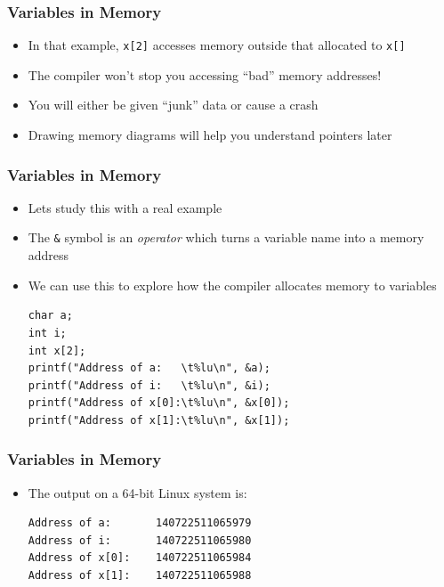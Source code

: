 \documentclass[14pt]{beamer}
\begin{document}
\begin{frame}
\frametitle{Variables in Memory}
\begin{itemize}
\item In that example, \texttt{x[2]} accesses memory outside that allocated to \texttt{x[]}
\item The compiler won't stop you accessing ``bad'' memory addresses!
\item You will either be given ``junk'' data or cause a crash
\item Drawing memory diagrams will help you understand pointers later
\end{itemize}
\end{frame}

\begin{frame}[fragile]
\frametitle{Variables in Memory}
\begin{itemize}
\item Lets study this with a real example
\item The \texttt{\&} symbol is an \textit{operator} which turns a variable name into a memory address
\item We can use this to explore how the compiler allocates memory to variables
\begin{lstlisting}[style=CStyle]
char a; 
int i; 
int x[2]; 
printf("Address of a:   \t%lu\n", &a); 
printf("Address of i:   \t%lu\n", &i); 
printf("Address of x[0]:\t%lu\n", &x[0]); 
printf("Address of x[1]:\t%lu\n", &x[1]); 
\end{lstlisting}
\end{itemize}
\end{frame}

\begin{frame}[fragile]
\frametitle{Variables in Memory}
\begin{itemize}
\item The output on a 64-bit Linux system is:
\begin{lstlisting}[style=pseudo]
Address of a:   	140722511065979
Address of i:   	140722511065980
Address of x[0]:	140722511065984
Address of x[1]:	140722511065988
\end{lstlisting}
\end{itemize}
\end{frame}
\end{document}
